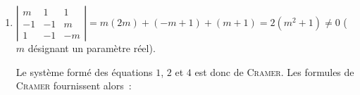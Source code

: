 {{\begin{enumerate}
Si $m = 0$, le système s'écrit 

\begin{align*}\ensuremath
\left\{
\begin{array}{l}
x+2y+3z=-1\\
2x+y+3t=1\\
3x+z+2t=0\\
3y+2z+t=0
\end{array}
\right.&\Leftrightarrow\left\{
\begin{array}{l}
x+y+z+t=\;(E_1+E_2)\\
2x+y+3t=1\\
x+y+z+t=0(E_3+E_4)\\
3y+2z+t=0
\end{array}
\right.\Leftrightarrow\left\{
\begin{array}{l}
t=-x-y-z\\
-x-2y-3z=1\\
-x+2y+z=0
\end{array}
\right.
\\
 &\Leftrightarrow\left\{
\begin{array}{l}
z=x-2y\\
-x-2y-3(x-2y)=1\\
t=-x-y-z
\end{array}
\right.\Leftrightarrow\left\{
\begin{array}{l}
y=x+\frac{1}{4}\
z=-x-\frac{1}{2}\\
t=-x+\frac{1}{4}
\end{array}
\right.
\end{align*}

D'où l'ensemble de solutions~:~$\{(x,x+\frac{1}{4},-x-\frac{1}{4};-x+\frac{1}{2}),\;x\in\Rr\}$.

Si $m=2$, on obtient pour ensemble de solutions~:~$\{(x,-x-\frac{5}{8},x+\frac{1}{2};-x-\frac{1}{8}),\;x\in\Rr\}$.

Si $m=4$ ou $m=-6$, on voit en résolvant que le système est incompatible.

\item  $\left|
\begin{array}{ccc}
m&1&1\\
-1&-1&m\\
1&-1&-m
\end{array}
\right|=m(2m)+(-m+1)+(m+1)=2(m^2+1)\neq 0$ ($m$ désignant un paramètre réel).

Le système formé des équations $1$, $2$ et $4$ est donc de \textsc{Cramer}. Les formules de \textsc{Cramer} fournissent alors~:


\end{enumerate}}}
